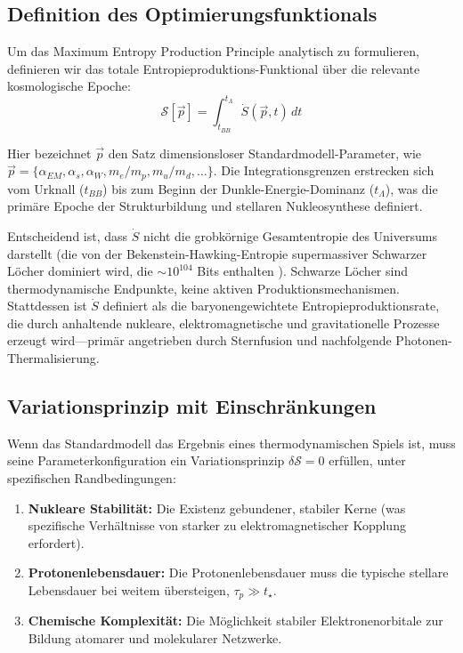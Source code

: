 \documentclass[12pt,a4paper]{article}
\theoremstyle{remark}
\begin{document}
\subsection{Definition des Optimierungsfunktionals}

Um das Maximum Entropy Production Principle analytisch zu formulieren, definieren wir das totale Entropieproduktions-Funktional \"uber die relevante kosmologische Epoche:
\begin{equation}
\mathcal{S}[\vec{p}] = \int_{t_{BB}}^{t_\Lambda} \dot{S}(\vec{p}, t) \, dt
\end{equation}

Hier bezeichnet $\vec{p}$ den Satz dimensionsloser Standardmodell-Parameter, wie $\vec{p} = \{\alpha_{EM}, \alpha_s, \alpha_W, m_e/m_p, m_u/m_d, \ldots\}$. Die Integrationsgrenzen erstrecken sich vom Urknall ($t_{BB}$) bis zum Beginn der Dunkle-Energie-Dominanz ($t_\Lambda$), was die prim\"are Epoche der Strukturbildung und stellaren Nukleosynthese definiert.

Entscheidend ist, dass $\dot{S}$ nicht die grobk\"ornige Gesamtentropie des Universums darstellt (die von der Bekenstein-Hawking-Entropie supermassiver Schwarzer L\"ocher dominiert wird, die $\sim 10^{104}$ Bits enthalten \citep{EntropyMaximum}). Schwarze L\"ocher sind thermodynamische Endpunkte, keine aktiven Produktionsmechanismen. Stattdessen ist $\dot{S}$ definiert als die baryonengewichtete Entropieproduktionsrate, die durch anhaltende nukleare, elektromagnetische und gravitationelle Prozesse erzeugt wird---prim\"ar angetrieben durch Sternfusion und nachfolgende Photonen-Thermalisierung.

\subsection{Variationsprinzip mit Einschr\"ankungen}

Wenn das Standardmodell das Ergebnis eines thermodynamischen Spiels ist, muss seine Parameterkonfiguration ein Variationsprinzip $\delta \mathcal{S} = 0$ erf\"ullen, unter spezifischen Randbedingungen:
\begin{enumerate}
    \item \textbf{Nukleare Stabilit\"at:} Die Existenz gebundener, stabiler Kerne (was spezifische Verh\"altnisse von starker zu elektromagnetischer Kopplung erfordert).
    \item \textbf{Protonenlebensdauer:} Die Protonenlebensdauer muss die typische stellare Lebensdauer bei weitem \"ubersteigen, $\tau_p \gg t_\star$.
    \item \textbf{Chemische Komplexit\"at:} Die M\"oglichkeit stabiler Elektronenorbitale zur Bildung atomarer und molekularer Netzwerke.
\end{enumerate}
\end{document}
